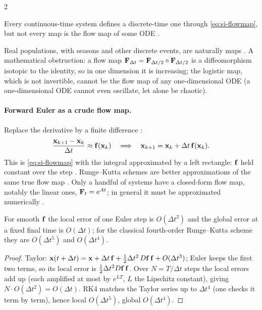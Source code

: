\begin{paracol}{2}
\begin{proposition}
Every continuous-time system defines a discrete-time one through \eqref{eq:si-flowmap}, but not every
map is the flow map of some ODE .
\end{proposition}
Real populations, with seasons and other discrete events, are naturally maps . A
mathematical obstruction: a flow map $\mathbf{F}_{\Delta t}=\mathbf{F}_{\Delta t/2}\circ\mathbf{F}_{\Delta t/2}$ is a
diffeomorphism isotopic to the identity, so in one dimension it is increasing; the logistic map, which
is not invertible, cannot be the flow map of any one-dimensional ODE (a one-dimensional ODE cannot even
oscillate, let alone be chaotic).

\paragraph{Forward Euler as a crude flow map.} Replace the derivative by a finite difference
:
\[
  \frac{\mathbf{x}_{k+1}-\mathbf{x}_k}{\Delta t}\approx\mathbf{f}(\mathbf{x}_k)
  \quad\Longrightarrow\quad
  \mathbf{x}_{k+1}=\mathbf{x}_k+\Delta t\,\mathbf{f}(\mathbf{x}_k) .
\]
This is \eqref{eq:si-flowmap} with the integral approximated by a left rectangle: $\mathbf{f}$ held constant
over the step . Runge--Kutta schemes are better approximations of the same
true flow map . Only a handful of systems have a closed-form flow map, notably the linear
ones, $\mathbf{F}_t=e^{At}$; in general it must be approximated numerically .

\begin{proposition}\label{prop:si-order}
For smooth $\mathbf{f}$ the local error of one Euler step is $O(\Delta t^2)$ and the global error at a fixed
final time is $O(\Delta t)$; for the classical fourth-order Runge--Kutta scheme they are $O(\Delta t^5)$
and $O(\Delta t^4)$.
\end{proposition}
\begin{proof}
Taylor: $\mathbf{x}(t+\Delta t)=\mathbf{x}+\Delta t\,\mathbf{f}+\tfrac12\Delta t^2\,D\mathbf{f}\,\mathbf{f}+O(\Delta t^3)$; Euler
keeps the first two terms, so its local error is $\tfrac12\Delta t^2 D\mathbf{f}\,\mathbf{f}$. Over $N=T/\Delta t$
steps the local errors add up (each amplified at most by $e^{LT}$, $L$ the Lipschitz constant), giving
$N\cdot O(\Delta t^2)=O(\Delta t)$. RK4 matches the Taylor series up to $\Delta t^4$ (one checks it
term by term), hence local $O(\Delta t^5)$, global $O(\Delta t^4)$.
\end{proof}


\end{paracol}
